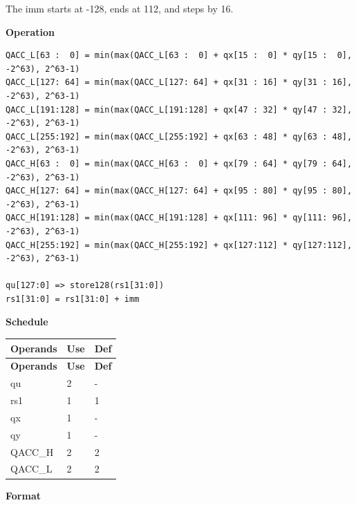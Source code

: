 The imm starts at -128, ends at 112, and steps by 16.

\textbf{Operation}\\
\begin{lstlisting}
QACC_L[63 :  0] = min(max(QACC_L[63 :  0] + qx[15 :  0] * qy[15 :  0], -2^63), 2^63-1)
QACC_L[127: 64] = min(max(QACC_L[127: 64] + qx[31 : 16] * qy[31 : 16], -2^63), 2^63-1)
QACC_L[191:128] = min(max(QACC_L[191:128] + qx[47 : 32] * qy[47 : 32], -2^63), 2^63-1)
QACC_L[255:192] = min(max(QACC_L[255:192] + qx[63 : 48] * qy[63 : 48], -2^63), 2^63-1)
QACC_H[63 :  0] = min(max(QACC_H[63 :  0] + qx[79 : 64] * qy[79 : 64], -2^63), 2^63-1)
QACC_H[127: 64] = min(max(QACC_H[127: 64] + qx[95 : 80] * qy[95 : 80], -2^63), 2^63-1)
QACC_H[191:128] = min(max(QACC_H[191:128] + qx[111: 96] * qy[111: 96], -2^63), 2^63-1)
QACC_H[255:192] = min(max(QACC_H[255:192] + qx[127:112] * qy[127:112], -2^63), 2^63-1)

qu[127:0] => store128(rs1[31:0])
rs1[31:0] = rs1[31:0] + imm
\end{lstlisting}

\textbf{Schedule}\\
\begin{longtable}[c]{|l|l|l|}
    \hline
    \rowcolor{lightgray}
    \textbf{Operands} & \textbf{Use} & \textbf{Def} \\\hline
    \endfirsthead
    \hline
    \rowcolor{lightgray}
     \textbf{Operands} & \textbf{Use} & \textbf{Def} \\\hline
    \endhead
    \hline
    \endfoot

    qu & 2 & - \\\hline
    rs1 & 1 & 1 \\\hline

     qx & 1 & - \\\hline
     qy & 1 & - \\\hline
     QACC\_H & 2 & 2 \\\hline
     QACC\_L & 2 & 2

\end{longtable}

\textbf{Format}\\

